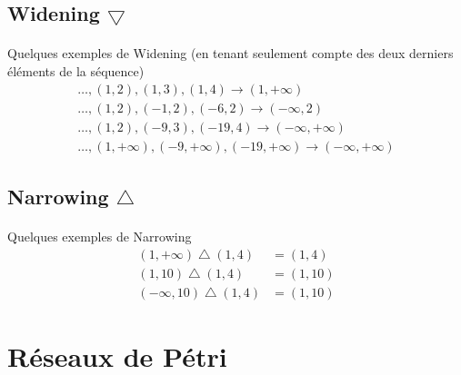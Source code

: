 \documentclass{article}
\begin{document}
    \subsection{Widening $\bigtriangledown$}
		\begin{algorithm}[H]
    \begin{algorithmic}
			\ENDIF
    \end{algorithmic}
		\end{algorithm}

		\paragraph{} Quelques exemples de Widening (en tenant seulement compte des deux derniers éléments de la séquence)
    \begin{align*}
      \ldots, (1, 2), (1, 3), (1, 4) \rightarrow (1, +\infty) \\
      \ldots, (1, 2), (-1, 2), (-6, 2) \rightarrow (-\infty, 2) \\
      \ldots, (1, 2), (-9, 3), (-19, 4) \rightarrow (-\infty, +\infty) \\
      \ldots, (1, +\infty), (-9, +\infty), (-19, +\infty) \rightarrow (-\infty, +\infty)
    \end{align*}

    \subsection{Narrowing $\bigtriangleup$}
		\begin{algorithm}[H]
    \begin{algorithmic}
      \ENDIF
    \end{algorithmic}
		\end{algorithm}

		\paragraph{} Quelques exemples de Narrowing
    \begin{align*}
      (1, +\infty) \bigtriangleup (1, 4) &= (1, 4) \\
			(1, 10) \bigtriangleup (1, 4) &= (1, 10) \\
			(-\infty, 10) \bigtriangleup (1, 4) &= (1, 10)
    \end{align*}

  \section{Réseaux de Pétri}
\end{document}

